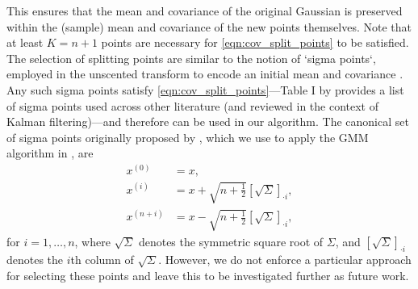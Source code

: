 This ensures that the mean and covariance of the original Gaussian is preserved within the (sample) mean and covariance of the new points themselves.
Note that at least \(K = n + 1\) points are necessary for \cref{eqn:cov_split_points} to be satisfied.
The selection of splitting points are similar to the notion of `sigma points`, employed in the unscented transform to encode an initial mean and covariance \citep{Uhlmann_1995_DynamicMapBuilding,JulierEtAl_2000_NewMethodNonlinear}.
Any such sigma points satisfy \cref{eqn:cov_split_points}---Table I by \citet{MenegazEtAl_2015_SystematizationUnscentedKalman} provides a list of sigma points used across other literature (and reviewed in the context of Kalman filtering)---and therefore can be used in our algorithm.
The canonical set of sigma points originally proposed by \citet{Uhlmann_1995_DynamicMapBuilding}, which we use to apply the GMM algorithm in , are
\begin{subequations}\label{eqn:uhlman_sigma}
	\begin{align}
		x^{(0)}     & = x,                                                                                              \\
		x^{(i)}     & = x + \sqrt{n + \frac12}\left[\sqrt{\Sigma}\right]_{\cdot i}, \\
		x^{(n + i)} & = x - \sqrt{n + \frac12}\left[\sqrt{\Sigma}\right]_{\cdot i},
	\end{align}
\end{subequations}
for \(i = 1,\dotsc, n\), where \(\sqrt{\Sigma}\) denotes the symmetric square root of \(\Sigma\), and \(\left[\sqrt{\Sigma}\right]_{\cdot i}\) denotes the \(i\)th column of \(\sqrt{\Sigma}\).
However, we do not enforce a particular approach for selecting these points and leave this to be investigated further as future work.

